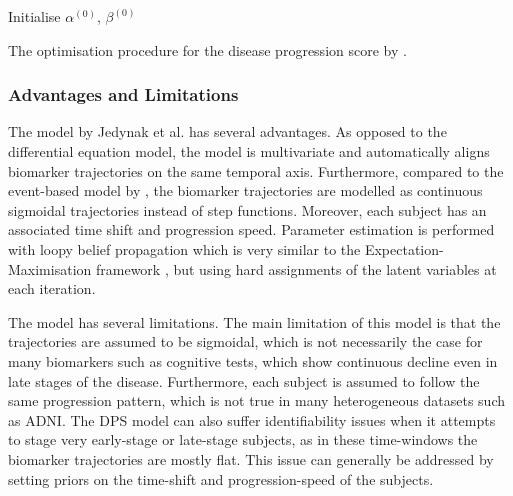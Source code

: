 \begin{algorithm}
 Initialise $\alpha^{(0)}$, $\beta^{(0)}$\;\label{alg:init}

  
 \caption{The optimisation procedure for the disease progression score by \cite{jedynak2012computational}.}
 \label{fig:algo_dps}
\end{algorithm}


\subsubsection{Advantages and Limitations}

The model by Jedynak et al. \cite{jedynak2012computational} has several advantages. As opposed to the differential equation model, the model is multivariate and automatically aligns biomarker trajectories on the same temporal axis. Furthermore, compared to the event-based model by \cite{fonteijn2012event}, the biomarker trajectories are modelled as continuous sigmoidal trajectories instead of step functions. Moreover, each subject has an associated time shift and progression speed. Parameter estimation is performed with loopy belief propagation which is very similar to the Expectation-Maximisation framework \cite{bishop2007pattern}, but using hard assignments of the latent variables at each iteration.

The model has several limitations. The main limitation of this model is that the trajectories are assumed to be sigmoidal, which is not necessarily the case for many biomarkers such as cognitive tests, which show continuous decline even in late stages of the disease. Furthermore, each subject is assumed to follow the same progression pattern, which is not true in many heterogeneous datasets such as ADNI. The DPS model can also suffer identifiability issues when it attempts to stage very early-stage or late-stage subjects, as in these time-windows the biomarker trajectories are mostly flat. This issue can generally be addressed by setting priors on the time-shift and progression-speed of the subjects.

